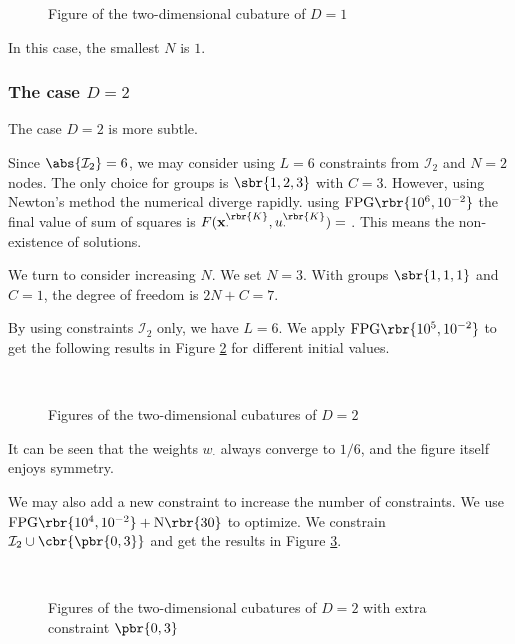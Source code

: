 \documentclass[english, nochinese]{pnote}
\begin{document}
\begin{figure}[htbp]
\centering
\scalebox{0.75}{}
\caption{Figure of the two-dimensional cubature of $ D = 1 $}
\label{Fig:M2D1}
\end{figure}

In this case, the smallest $N$ is $1$.

\subsubsection{The case $ D = 2 $}

The case $ D = 2 $ is more subtle.

Since $ \abs{\mathcal{I}_2} = 6 $, we may consider using $ L = 6 $ constraints from $\mathcal{I}_2$ and $ N = 2 $ nodes. The only choice for groups is $ \sbr{ 1, 2, 3 } $ with $ C = 3 $. However, using Newton's method the numerical diverge rapidly. using $ \text{FPG} \rbr{ 10^6, 10^{-2} }$ the final value of sum of squares is $ F ( \mathbf{x}_{\cdot}^{\rbr{K}}, u_{\cdot}^{\rbr{K}} ) = \text{} $. This means the non-existence of solutions.

We turn to consider increasing $N$. We set $ N = 3 $. With groups $ \sbr{ 1, 1, 1 } $ and $ C = 1 $, the degree of freedom is $ 2 N + C = 7 $.

By using constraints $\mathcal{I}_2$ only, we have $ L = 6 $. We apply $ \text{FPG} \rbr{ 10^5, 10^{-2} } $ to get the following results in Figure \ref{Fig:M2D2Ran} for different initial values.

\begin{figure}[htbp]
\centering
\scalebox{0.75}{}~
\scalebox{0.75}{}
\scalebox{0.75}{}~
\scalebox{0.75}{}
\scalebox{0.75}{}~
\scalebox{0.75}{}
\caption{Figures of the two-dimensional cubatures of $ D = 2 $}
\label{Fig:M2D2Ran}
\end{figure}

It can be seen that the weights $w_{\cdot}$ always converge to $ 1 / 6 $, and the figure itself enjoys symmetry.

We may also add a new constraint to increase the number of constraints. We use $ \text{FPG} \rbr{ 10^4, 10^{-2} } + \text{N} \rbr{30} $ to optimize. We constrain $ \mathcal{I}_2 \cup \cbr{ \pbr{ 0, 3 } } $ and get the results in Figure \ref{Fig:M2D203}.

\begin{figure}[htbp]
\centering
\scalebox{0.75}{}~
\scalebox{0.75}{}
\caption{Figures of the two-dimensional cubatures of $ D = 2 $ with extra constraint $ \pbr{ 0, 3 } $}
\label{Fig:M2D203}
\end{figure}
\end{document}
